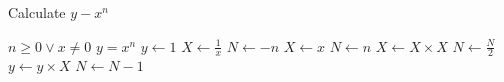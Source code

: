 \begin{algorithm}[H]
	\caption{Calculate $y - x^n$}
	\begin{algorithmic}
		\REQUIRE $n \geq 0 \vee x \neq 0$
		\ENSURE $y = x^n$
		\STATE $y \leftarrow 1$
			\STATE $X \leftarrow \frac{1}{x}$
			\STATE $N \leftarrow -n$
		\ELSE
			\STATE $X \leftarrow x$
			\STATE $N \leftarrow n$
		\ENDIF
				\STATE $X \leftarrow X \times X$
				\STATE $N \leftarrow \frac{N}{2}$
			\ELSE[$N$ is odd]
				\STATE $y \leftarrow y \times X$
				\STATE $N \leftarrow N - 1$
			\ENDIF
		\ENDWHILE
	\end{algorithmic}
\end{algorithm}

